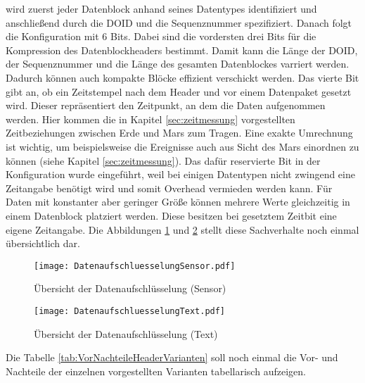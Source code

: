 wird zuerst jeder Datenblock anhand seines Datentypes identifiziert und
anschließend durch die \gls{DOID} und die Sequenznummer spezifiziert. Danach
folgt die Konfiguration mit $6$ Bits. Dabei sind die vordersten drei Bits für
die Kompression des Datenblockheaders bestimmt. Damit kann die Länge der
\gls{DOID}, der Sequenznummer und die Länge des gesamten Datenblockes varriert
werden. Dadurch können auch kompakte Blöcke effizient verschickt werden.
Das vierte Bit gibt an, ob ein Zeitstempel nach dem Header und vor einem
Datenpaket gesetzt wird. Dieser repräsentiert den Zeitpunkt, an dem die Daten
aufgenommen werden. Hier kommen die in Kapitel \ref{sec:zeitmessung}
vorgestellten Zeitbeziehungen zwischen Erde und Mars zum Tragen. Eine
exakte Umrechnung ist wichtig, um beispielsweise die Ereignisse auch
aus Sicht des Mars einordnen zu können (siehe Kapitel \ref{sec:zeitmessung}).
Das dafür reservierte Bit in der Konfiguration wurde eingeführt, weil bei
einigen Datentypen nicht zwingend eine Zeitangabe benötigt wird und somit
Overhead vermieden werden kann. Für Daten mit konstanter aber geringer Größe
können mehrere Werte gleichzeitig in einem Datenblock platziert werden. Diese
besitzen bei gesetztem Zeitbit eine eigene Zeitangabe. Die Abbildungen
\ref{fig:uebersichtdatenaufschluesselung_sensor} und
\ref{fig:uebersichtdatenaufschluesselung_text} stellt diese Sachverhalte noch
einmal übersichtlich dar.

\begin{figure}[H]
  \centering
  \texttt{[image: DatenaufschluesselungSensor.pdf]} 
  \caption{Übersicht der Datenaufschlüsselung (Sensor)}
  \label{fig:uebersichtdatenaufschluesselung_sensor}
\end{figure}

\begin{figure}[H]
	\centering
	\texttt{[image: DatenaufschluesselungText.pdf]}
	\caption{Übersicht der Datenaufschlüsselung (Text)}
	\label{fig:uebersichtdatenaufschluesselung_text}
\end{figure}

Die Tabelle \ref{tab:VorNachteileHeaderVarianten} soll noch einmal die Vor- und
Nachteile der einzelnen vorgestellten Varianten tabellarisch aufzeigen.


